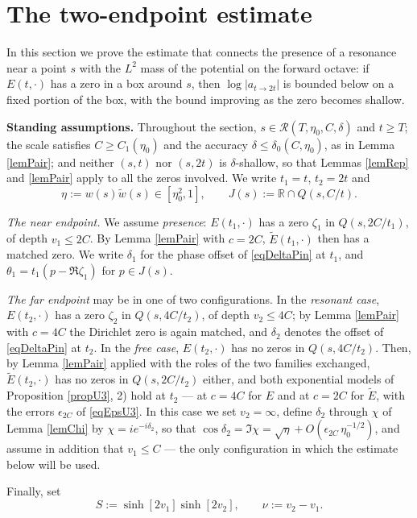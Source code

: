 \documentclass[11pt,twoside,reqno]{amsart}
\def\ti{\tilde}
\def\to{\rightarrow}
\def\R{{\mathbb R}}
\def\RR{{\mathcal{R}}}
\def\d{\delta}
\theoremstyle{plain}
\numberwithin{equation}{section}
\begin{document}
\section{The two-endpoint estimate}\label{secTE}

In this section we prove the estimate that connects the presence of a resonance near a point $s$ with the $L^2$ mass of the potential on the forward octave: if $E(t,\cdot)$ has a zero in a box around $s$, then $\log|a_{t\to2t}|$ is bounded below on a fixed portion of the box, with the bound improving as the zero becomes shallow.

{\bf Standing assumptions.} Throughout the section, $s\in\RR(T,\eta_0,C,\d)$ and $t\geq T$; the scale satisfies $C\geq C_1(\eta_0)$ and the accuracy $\d\leq\d_0(C,\eta_0)$, as in Lemma \ref{lemPair}; and neither $(s,t)$ nor $(s,2t)$ is $\d$-shallow, so that Lemmas \ref{lemRep} and \ref{lemPair} apply to all the zeros involved. We write $t_1=t$, $t_2=2t$ and
$$\eta:=w(s)\ti w(s)\in[\eta_0^2,1],\qquad J(s):=\R\cap Q(s,C/t).$$

{\it The near endpoint.} We assume {\it presence}: $E(t_1,\cdot)$ has a zero $\zeta_1$ in $Q(s,2C/t_1)$, of depth $v_1\leq2C$. By Lemma \ref{lemPair} with $c=2C$, $\ti E(t_1,\cdot)$ then has a matched zero. We write $\d_1$ for the phase offset of \eqref{eqDeltaPin} at $t_1$, and $\theta_1=t_1(p-\Re\zeta_1)$ for $p\in J(s)$.

{\it The far endpoint} may be in one of two configurations. In the {\it resonant case}, $E(t_2,\cdot)$ has a zero $\zeta_2$ in $Q(s,4C/t_2)$, of depth $v_2\leq4C$; by Lemma \ref{lemPair} with $c=4C$ the Dirichlet zero is again matched, and $\d_2$ denotes the offset of \eqref{eqDeltaPin} at $t_2$. In the {\it free case}, $E(t_2,\cdot)$ has no zeros in $Q(s,4C/t_2)$. Then, by Lemma \ref{lemPair} applied with the roles of the two families exchanged, $\ti E(t_2,\cdot)$ has no zeros in $Q(s,2C/t_2)$ either, and both exponential models of Proposition \ref{propU3}, 2) hold at $t_2$ --- at $c=4C$ for $E$ and at $c=2C$ for $\ti E$, with the errors $\epsilon_{2C}$ of \eqref{eqEpsU3}. In this case we set $v_2=\infty$, define $\d_2$ through $\chi$ of Lemma \ref{lemChi} by $\chi=ie^{-i\d_2}$, so that $\cos\d_2=\Im\chi=\sqrt\eta+O(\epsilon_{2C}\,\eta_0^{-1/2})$, and assume in addition that $v_1\leq C$ --- the only configuration in which the estimate below will be used.

Finally, set
$$S:=\sinh [2v_1]\sinh [2v_2],\qquad \nu:=v_2-v_1 .$$
\end{document}
